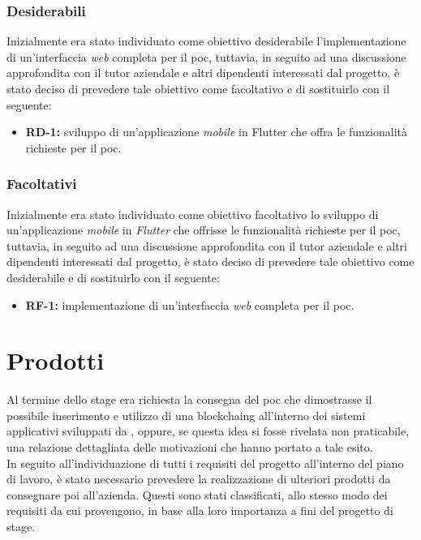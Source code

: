 \subsubsection*{Desiderabili}

Inizialmente era stato individuato come obiettivo desiderabile l'implementazione di un'interfaccia \textit{web} completa per il \gls{poc}, tuttavia, in seguito ad una discussione approfondita con il tutor aziendale e altri dipendenti interessati dal progetto, è stato deciso di prevedere tale obiettivo come facoltativo e di sostituirlo con il seguente:

\begin{itemize}
	\item \textbf{RD-1:} sviluppo di un'applicazione \textit{mobile} in Flutter che offra le funzionalità richieste per il \gls{poc}.
\end{itemize}

\subsubsection*{Facoltativi}

Inizialmente era stato individuato come obiettivo facoltativo lo sviluppo di un'applicazione \textit{mobile} in \textit{Flutter} che offrisse le funzionalità richieste per il \gls{poc}, tuttavia, in seguito ad una discussione approfondita con il tutor aziendale e altri dipendenti interessati dal progetto, è stato deciso di prevedere tale obiettivo come desiderabile e di sostituirlo con il seguente:

\begin{itemize}
	\item \textbf{RF-1:} implementazione di un'interfaccia \textit{web} completa per il \gls{poc}.
\end{itemize} 

\section{Prodotti}

Al termine dello stage era richiesta la consegna del \gls{poc} che dimostrasse il possibile inserimento e utilizzo di una \gls{blockchaing} all'interno dei sistemi applicativi sviluppati da \myCompany{} \companyTitle, oppure, se questa idea si fosse rivelata non praticabile, una relazione dettagliata delle motivazioni che hanno portato a tale esito.\\
In seguito all'individuazione di tutti i requisiti del progetto all'interno del piano di lavoro, è stato necessario prevedere la realizzazione di ulteriori prodotti da consegnare poi all'azienda. Questi sono stati classificati, allo stesso modo dei requisiti da cui provengono, in base alla loro importanza a fini del progetto di stage.

